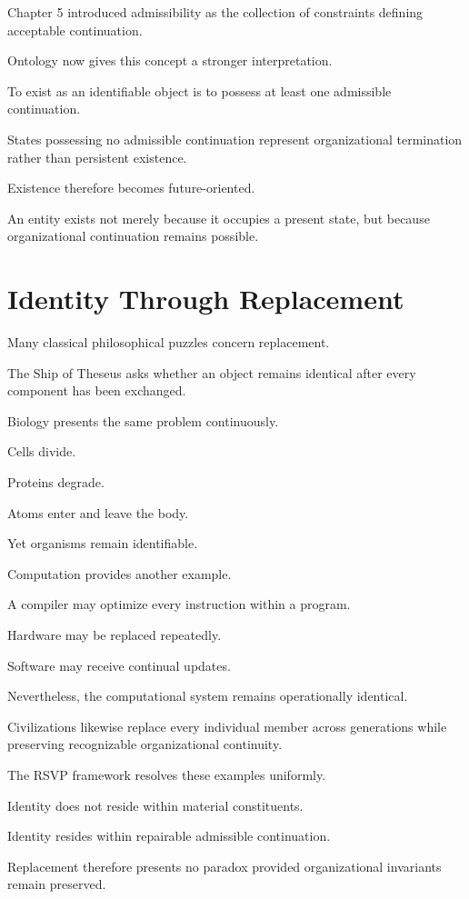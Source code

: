 \documentclass[11pt,oneside]{book}
\numberwithin{equation}{chapter}
\theoremstyle{definition}
\theoremstyle{plain}
\begin{document}
Chapter 5 introduced admissibility as the collection of constraints
defining acceptable continuation.

Ontology now gives this concept a stronger interpretation.

To exist as an identifiable object is to possess at least one admissible
continuation.

States possessing no admissible continuation represent organizational
termination rather than persistent existence.

Existence therefore becomes future-oriented.

An entity exists not merely because it occupies a present state, but
because organizational continuation remains possible.

\section{Identity Through Replacement}

Many classical philosophical puzzles concern replacement.

The Ship of Theseus asks whether an object remains identical after every
component has been exchanged.

Biology presents the same problem continuously.

Cells divide.

Proteins degrade.

Atoms enter and leave the body.

Yet organisms remain identifiable.

Computation provides another example.

A compiler may optimize every instruction within a program.

Hardware may be replaced repeatedly.

Software may receive continual updates.

Nevertheless, the computational system remains operationally identical.

Civilizations likewise replace every individual member across generations
while preserving recognizable organizational continuity.

The RSVP framework resolves these examples uniformly.

Identity does not reside within material constituents.

Identity resides within repairable admissible continuation.

Replacement therefore presents no paradox provided organizational
invariants remain preserved.
\end{document}
